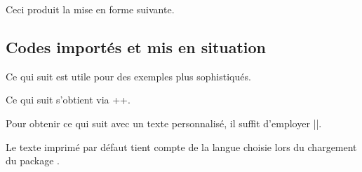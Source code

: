 

\begin{bdocexa}
    \leavevmode

    \begin{bdoclatex}[code]
    \end{bdoclatex}

    Ceci produit la mise en forme suivante.

\end{bdocexa}




\subsection{Codes importés et mis en situation} \label{bdoc-latexshow}

Ce qui suit est utile pour des exemples plus sophistiqués.

\begin{bdocexa}[Showcase]
    Ce qui suit s'obtient via \bdocinlatex++.

    \medskip

    \begin{bdoc-doc-showcase}
    \end{bdoc-doc-showcase}
\end{bdocexa}




\begin{bdocexa}
    Pour obtenir ce qui suit avec un texte personnalisé, il suffit d'employer \bdocinlatex||.

    \medskip

    \begin{bdoc-doc-showcase}
    \end{bdoc-doc-showcase}
\end{bdocexa}




\begin{bdocnote}
    Le texte imprimé par défaut tient compte de la langue choisie lors du chargement du package .
\end{bdocnote}



